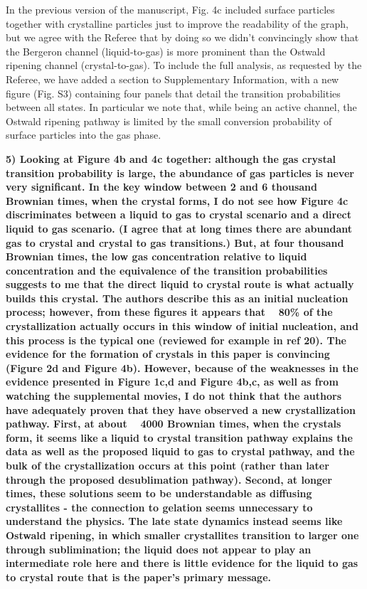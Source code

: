 \documentclass[11pt]{article}
\begin{document}
In the previous version of the manuscript, Fig. 4c included surface particles together with crystalline particles just to improve
the readability of the graph, but we agree with the Referee that by doing so we didn't convincingly show that the Bergeron channel (liquid-to-gas)
is more prominent than the Ostwald ripening channel (crystal-to-gas). 
To include the full analysis, as requested by the Referee,
we have added a section to Supplementary Information, with a new figure (Fig. S3) containing four panels that detail the transition
probabilities between all states. In particular we note that, while being an active channel, the Ostwald ripening pathway is limited by
the small conversion probability of surface particles into the gas phase.






\vspace{1em}

\singlespacing

{\bf
5) Looking at Figure 4b and 4c together: although the gas crystal transition probability is large, the abundance of gas particles is never very significant. In the key window between 2 and 6 thousand Brownian times, when the crystal forms, I do not see how Figure 4c discriminates between a liquid to gas to crystal scenario and a direct liquid to gas scenario. (I agree that at long times there are abundant gas to crystal and crystal to gas transitions.) But, at four thousand Brownian times, the low gas concentration relative to liquid concentration and the equivalence of the transition probabilities suggests to me that the direct liquid to crystal route is what actually builds this crystal. The authors describe this as an initial nucleation process; however, from these figures it appears that ~ 80\% of the crystallization actually occurs in this window of initial nucleation, and this process is the typical one (reviewed for example in ref 20).
The evidence for the formation of crystals in this paper is convincing (Figure 2d and Figure 4b). However, because of the weaknesses in the evidence presented in Figure 1c,d and Figure 4b,c, as well as from watching the supplemental movies, I do not think that the authors have adequately proven that they have observed a new crystallization pathway. First, at about ~ 4000 Brownian times, when the crystals form, it seems like a liquid to crystal transition pathway explains the data as well as the proposed liquid to gas to crystal pathway, and the bulk of the crystallization occurs at this point (rather than later through the proposed desublimation pathway). Second, at longer times, these solutions seem to be understandable as diffusing crystallites - the connection to gelation seems unnecessary to understand the physics. The late state dynamics instead seems like Ostwald ripening, in which smaller crystallites transition to larger one through sublimination; the liquid does not appear to play an intermediate 
role here and there is little evidence for the liquid to gas to crystal route that is the paper's primary message.
}
\end{document}
